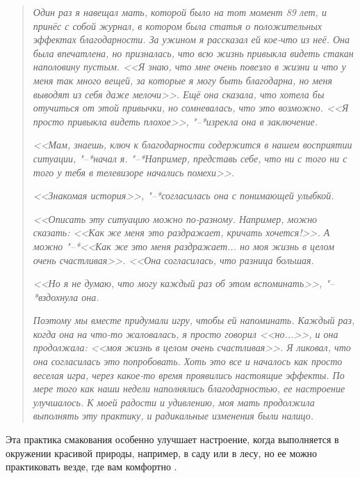 \begin{quotation}
	\textit{
		Один раз я навещал мать, которой было на тот момент 89 лет, и принёс с собой журнал, в котором была статья о положительных эффектах благодарности. За ужином я рассказал ей кое-что из неё. Она была впечатлена, но призналась, что всю жизнь привыкла видеть стакан наполовину пустым. <<Я знаю, что мне очень повезло в жизни и что у меня так много вещей, за которые я могу быть благодарна, но меня выводят из себя даже мелочи>>. Ещё она сказала, что хотела бы отучиться от этой привычки, но сомневалась, что это возможно. <<Я просто привыкла видеть плохое>>, "--*изрекла она в заключение.
	}
	
	\textit{
		<<Мам, знаешь, ключ к благодарности содержится в нашем восприятии ситуации, "--*начал я. "--*Например, представь себе, что ни с того ни с того у тебя в телевизоре начались помехи>>.
	}
	
	\textit{<<Знакомая история>>, "--*согласилась она с понимающей улыбкой.}
	
	\textit{
		<<Описать эту ситуацию можно по-разному. Например, можно сказать: <<Как же меня это раздражает, кричать хочется!>>. А можно "--*<<Как же это меня раздражает... но моя жизнь в целом очень счастливая>>. <<Она согласилась, что разница большая.
	}
	
	\textit{<<Но я не думаю, что могу каждый раз об этом вспоминать>>, "--*вздохнула она.}
	
	\textit{
		Поэтому мы вместе придумали игру, чтобы ей напоминать. Каждый раз, когда она на что-то жаловалась, я просто говорил <<но...>>, и она продолжала: <<моя жизнь в целом очень счастливая>>. Я ликовал, что она согласилась это попробовать. Хоть это все и началось как просто веселая игра, через какое-то время проявились настоящие эффекты. По мере того как наши недели наполнялись благодарностью, ее настроение улучшалось. К моей радости и удивлению, моя мать продолжила выполнять эту практику, и радикальные изменения были налицо.
}
\end{quotation}

 \label{IP:Sense_and_Savor_Walk}

Эта практика смакования особенно улучшает настроение, когда выполняется в окружении красивой природы, например, в саду или в лесу, но ее можно практиковать везде, где вам комфортно \cite{126}.

